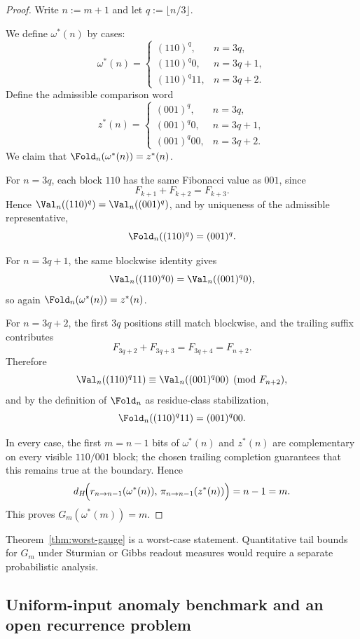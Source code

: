 \begin{proof}
Write $n:=m+1$ and let $q:=\lfloor n/3\rfloor$.

We define $\omega^\ast(n)$ by cases:
\[
\omega^\ast(n)=
\begin{cases}
(110)^q, & n=3q,\\[2mm]
(110)^q 0, & n=3q+1,\\[2mm]
(110)^q 11, & n=3q+2.
\end{cases}
\]
Define the admissible comparison word
\[
z^\ast(n)=
\begin{cases}
(001)^q, & n=3q,\\[2mm]
(001)^q 0, & n=3q+1,\\[2mm]
(001)^q 00, & n=3q+2.
\end{cases}
\]
We claim that $\Fold_n(\omega^\ast(n))=z^\ast(n)$.

For $n=3q$, each block $110$ has the same Fibonacci value as $001$, since
\[
F_{k+1}+F_{k+2}=F_{k+3}.
\]
Hence $\Val_n((110)^q)=\Val_n((001)^q)$, and by uniqueness of the admissible representative,
\[
\Fold_n((110)^q)=(001)^q.
\]

For $n=3q+1$, the same blockwise identity gives
\[
\Val_n((110)^q0)=\Val_n((001)^q0),
\]
so again $\Fold_n(\omega^\ast(n))=z^\ast(n)$.

For $n=3q+2$, the first $3q$ positions still match blockwise, and the trailing suffix contributes
\[
F_{3q+2}+F_{3q+3}=F_{3q+4}=F_{n+2}.
\]
Therefore
\[
\Val_n((110)^q11)\equiv \Val_n((001)^q00)\pmod{F_{n+2}},
\]
and by the definition of $\Fold_n$ as residue-class stabilization,
\[
\Fold_n((110)^q11)=(001)^q00.
\]

In every case, the first $m=n-1$ bits of $\omega^\ast(n)$ and $z^\ast(n)$ are complementary on every visible $110/001$ block; the chosen trailing completion guarantees that this remains true at the boundary. Hence
\[
d_H\!\Bigl(r_{n\to n-1}(\omega^\ast(n)),\,\pi_{n\to n-1}(z^\ast(n))\Bigr)=n-1=m.
\]
This proves $G_m(\omega^\ast(m))=m$.
\end{proof}

\begin{remark}
Theorem~\ref{thm:worst-gauge} is a worst-case statement. Quantitative tail bounds for $G_m$ under Sturmian or Gibbs readout measures would require a separate probabilistic analysis.
\end{remark}

\subsection{Uniform-input anomaly benchmark and an open recurrence problem}\label{app:gauge-rate}

